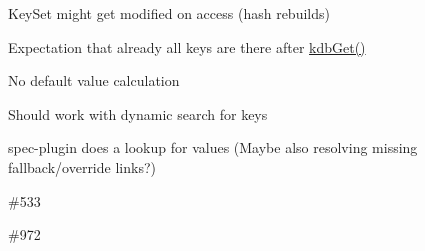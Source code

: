 
\begin{DoxyItemize}
\item Key\+Set might get modified on access (hash rebuilds)
\item Expectation that already all keys are there after {\ttfamily \mbox{\hyperlink{group__kdb_ga28e385fd9cb7ccfe0b2f1ed2f62453a1}{kdb\+Get()}}}
\item No default value calculation
\end{DoxyItemize}


\begin{DoxyItemize}
\item Should work with dynamic search for keys
\end{DoxyItemize}


\begin{DoxyItemize}
\item spec-\/plugin does a lookup for values (Maybe also resolving missing fallback/override links?)
\end{DoxyItemize}


\begin{DoxyItemize}
\item \#533
\item \#972 
\end{DoxyItemize}